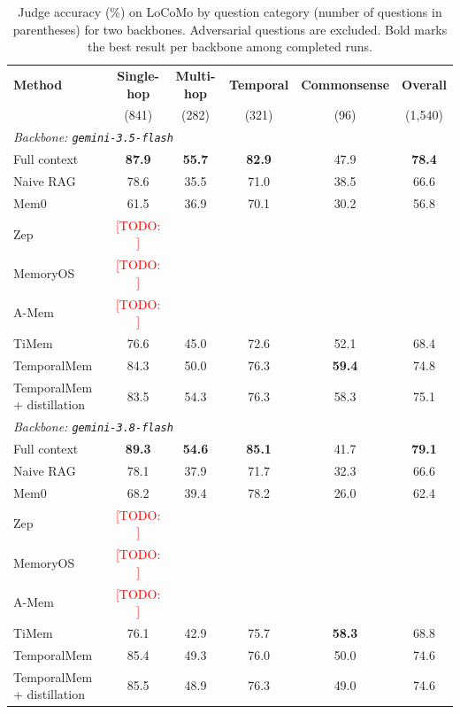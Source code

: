 \documentclass[11pt]{article}
\newcommand{\ours}{TemporalMem}
\newcommand{\todo}[1]{\textcolor{red}{[TODO: #1]}}
\begin{document}
\begin{table}[t]
  \centering
  \begin{tabular}{lccccc}
    \toprule
    \textbf{Method} & \textbf{Single-hop} & \textbf{Multi-hop} & \textbf{Temporal} & \textbf{Commonsense} & \textbf{Overall} \\
     & (841) & (282) & (321) & (96) & (1{,}540) \\
    \midrule
    \multicolumn{6}{l}{\textit{Backbone: \texttt{gemini-3.5-flash}}} \\
    Full context & \textbf{87.9} & \textbf{55.7} & \textbf{82.9} & 47.9 & \textbf{78.4} \\
    Naive RAG    & 78.6 & 35.5 & 71.0 & 38.5 & 66.6 \\
    Mem0         & 61.5 & 36.9 & 70.1 & 30.2 & 56.8 \\
    Zep          & \todo{} & & & & \\
    MemoryOS     & \todo{} & & & & \\
    A-Mem        & \todo{} & & & & \\
    TiMem        & 76.6 & 45.0 & 72.6 & 52.1 & 68.4 \\
    \ours                  & 84.3 & 50.0 & 76.3 & \textbf{59.4} & 74.8 \\
    \ours{} + distillation & 83.5 & 54.3 & 76.3 & 58.3 & 75.1 \\
    \midrule
    \multicolumn{6}{l}{\textit{Backbone: \texttt{gemini-3.8-flash}}} \\
    Full context & \textbf{89.3} & \textbf{54.6} & \textbf{85.1} & 41.7 & \textbf{79.1} \\
    Naive RAG    & 78.1 & 37.9 & 71.7 & 32.3 & 66.6 \\
    Mem0         & 68.2 & 39.4 & 78.2 & 26.0 & 62.4 \\
    Zep          & \todo{} & & & & \\
    MemoryOS     & \todo{} & & & & \\
    A-Mem        & \todo{} & & & & \\
    TiMem        & 76.1 & 42.9 & 75.7 & \textbf{58.3} & 68.8 \\
    \ours                  & 85.4 & 49.3 & 76.0 & 50.0 & 74.6 \\
    \ours{} + distillation & 85.5 & 48.9 & 76.3 & 49.0 & 74.6 \\
    \bottomrule
  \end{tabular}
  \caption{Judge accuracy (\%) on LoCoMo by question category (number of questions in parentheses) for two backbones. Adversarial questions are excluded. Bold marks the best result per backbone among completed runs.}
  \label{tab:locomo}
\end{table}
\end{document}
